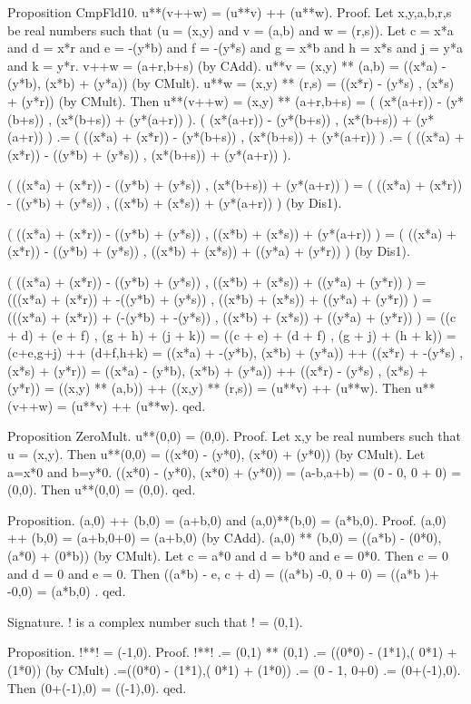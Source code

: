 \documentclass{article}
\newenvironment{forthel}{\begin{leftbar}}{\end{leftbar}}
\begin{document}
\begin{forthel}
Proposition CmpFld10. u**(v++w) = (u**v) ++ (u**w).
Proof.	Let x,y,a,b,r,s be real numbers such that (u = (x,y) and v = (a,b) and w = (r,s)).
Let c = x*a and d = x*r and e = -(y*b) and f = -(y*s) and g = x*b and  h = x*s and  j = y*a and k = y*r.
v++w = (a+r,b+s) (by CAdd).
u**v = (x,y) ** (a,b) = ((x*a) - (y*b), (x*b) + (y*a)) (by CMult).  
u**w = (x,y) ** (r,s) = ((x*r) - (y*s) , (x*s) + (y*r)) (by CMult). 
Then u**(v++w) 	= (x,y) ** (a+r,b+s) = ( (x*(a+r)) - (y*(b+s)) , (x*(b+s)) + (y*(a+r)) ).
( (x*(a+r)) - (y*(b+s)) , (x*(b+s)) + (y*(a+r)) )
.= ( ((x*a) + (x*r)) - (y*(b+s)) , (x*(b+s)) + (y*(a+r)) )
.= ( ((x*a) + (x*r)) - ((y*b) + (y*s)) , (x*(b+s)) + (y*(a+r)) ).

( ((x*a) + (x*r)) - ((y*b) + (y*s)) , (x*(b+s)) + (y*(a+r)) )
= ( ((x*a) + (x*r)) - ((y*b) + (y*s)) , ((x*b) + (x*s)) + (y*(a+r)) ) (by Dis1).

( ((x*a) + (x*r)) - ((y*b) + (y*s)) , ((x*b) + (x*s)) + (y*(a+r)) )
= ( ((x*a) + (x*r)) - ((y*b) + (y*s)) , ((x*b) + (x*s)) + ((y*a) + (y*r)) ) (by Dis1).

( ((x*a) + (x*r)) - ((y*b) + (y*s)) , ((x*b) + (x*s)) + ((y*a) + (y*r)) )
= (((x*a) + (x*r)) + -((y*b) + (y*s)) , ((x*b) + (x*s)) + ((y*a) + (y*r)) )
= (((x*a) + (x*r)) + (-(y*b) + -(y*s)) , ((x*b) + (x*s)) + ((y*a) + (y*r)) )
= ((c + d) + (e + f) , (g + h) + (j + k))
= ((c + e) + (d + f) , (g + j) + (h + k))
= (c+e,g+j) ++ (d+f,h+k)
= ((x*a) + -(y*b), (x*b) + (y*a)) ++ ((x*r) + -(y*s) , (x*s) + (y*r))
= ((x*a) - (y*b), (x*b) + (y*a)) ++ ((x*r) - (y*s) , (x*s) + (y*r))
= ((x,y) ** (a,b)) ++ ((x,y) ** (r,s)) 
= (u**v) ++ (u**w).
Then u**(v++w) = (u**v) ++ (u**w).
qed.

Proposition ZeroMult. u**(0,0) = (0,0).
Proof. Let x,y be real numbers such that u = (x,y). Then u**(0,0) = ((x*0) - (y*0), (x*0) + (y*0)) (by CMult). 
Let a=x*0 and b=y*0.
((x*0) - (y*0), (x*0) + (y*0)) = (a-b,a+b) = (0 - 0, 0 + 0) = (0,0). 
Then u**(0,0) = (0,0). 
qed.

Proposition. (a,0) ++ (b,0) = (a+b,0) and (a,0)**(b,0) = (a*b,0).
Proof. 	(a,0) ++ (b,0) = (a+b,0+0) = (a+b,0) (by CAdd).
(a,0) ** (b,0) = ((a*b) - (0*0), (a*0) + (0*b)) (by CMult).
Let c = a*0 and d = b*0 and e = 0*0.
Then c = 0 and d = 0 and e = 0.
Then ((a*b) - e, c + d) = ((a*b) -0, 0 + 0) = ((a*b )+ -0,0) = (a*b,0) . qed.

Signature. ! is a complex number such that ! = (0,1).

Proposition. !**! = (-1,0).
Proof. 	!**! .= (0,1) ** (0,1) 
.= ((0*0) - (1*1),( 0*1) + (1*0)) (by CMult)
.=((0*0) - (1*1),( 0*1) + (1*0)) 
.= (0 - 1, 0+0) 
.= (0+(-1),0).
Then (0+(-1),0) = ((-1),0). 
qed.


\end{forthel}
\end{document}
